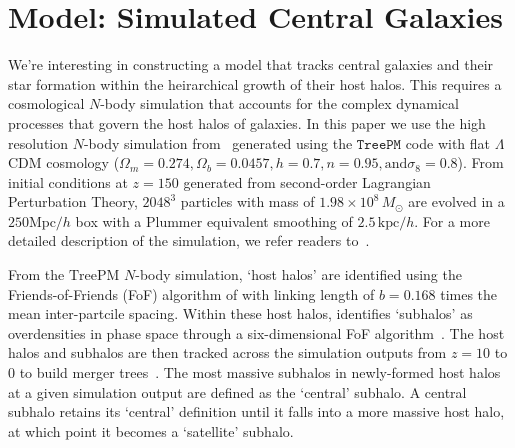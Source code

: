 \documentclass[12pt, letterpaper, preprint, tighten]{aastex}
\begin{document}
\section{Model: Simulated Central Galaxies} \label{sec:sim}
We're interesting in constructing a model that tracks central galaxies and 
their star formation within the heirarchical growth of their host halos. This 
requires a cosmological $N$-body simulation that accounts for the complex 
dynamical processes that govern the host halos of galaxies. In this paper 
we use the high resolution $N$-body simulation from~\cite{wetzel2013} generated 
using the \cite{white2002} $\mathtt{TreePM}$ code with flat $\Lambda$CDM cosmology 
($\Omega_m =0.274, \Omega_b = 0.0457, h = 0.7, n=0.95, \mathrm{and} \sigma_8 = 0.8$).
From initial conditions at $z = 150$ generated from second-order Lagrangian 
Perturbation Theory, $2048^3$ particles with mass of $1.98 \times 10^8\,M_\odot$ are 
evolved in a $250 \mathrm{Mpc}/h$ box with a Plummer equivalent smoothing of 
$2.5\,\mathrm{kpc}/h$. For a more detailed description of the simulation, we 
refer readers to~\cite{wetzel2013, wetzel2014}.

From the $\mathrm{TreePM}$ $N$-body simulation, `host halos' are identified 
using the Friends-of-Friends (FoF) algorithm of \cite{davis1985} with 
linking length of $b = 0.168$ times the mean inter-partcile spacing. Within 
these host halos, \cite{wetzel2013} identifies `subhalos' as overdensities 
in phase space through a six-dimensional FoF algorithm~\citep[FoF6D][]{white2010}. 
The host halos and subhalos are then tracked across the simulation outputs 
from $z = 10$ to $0$ to build merger trees~\citep{wetzel2009,wetzel2010}. 
The most massive subhalos in newly-formed host halos at a given simulation 
output are defined as the `central' subhalo. A central subhalo retains its 
`central' definition until it falls into a more massive host halo, at which 
point it becomes a `satellite' subhalo. 
\end{document}
